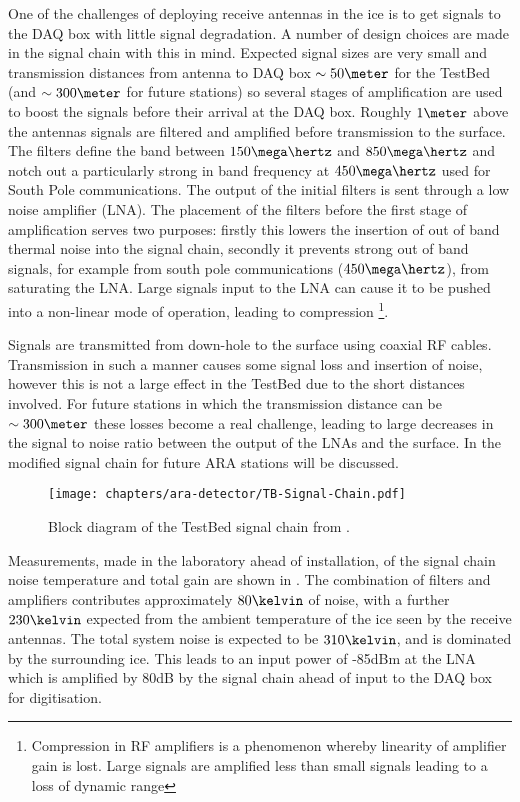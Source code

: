 One of the challenges of deploying receive antennas in the ice is to get signals to the DAQ box with little signal degradation. A number of design choices are made in the signal chain with this in mind. Expected signal sizes are very small and transmission distances from antenna to DAQ box $\sim 50\meter$ for the TestBed (and $\sim 300\meter$ for future stations) so several stages of amplification are used to boost the signals before their arrival at the DAQ box. Roughly $1 \meter$ above the antennas signals are filtered and amplified before transmission to the surface. The filters define the band between $150 \mega\hertz$ and $850 \mega\hertz$ and notch out a particularly strong in band frequency at $450 \mega \hertz$ used for South Pole communications. The output of the initial filters is sent through a low noise amplifier (LNA). The placement of the filters before the first stage of amplification serves two purposes: firstly this lowers the insertion of out of band thermal noise into the signal chain, secondly it prevents strong out of band signals, for example from south pole communications ($450 \mega\hertz$), from saturating the LNA. Large signals input to the LNA can cause it to be pushed into a non-linear mode of operation, leading to compression \footnote{Compression in RF amplifiers is a phenomenon whereby linearity of amplifier gain is lost. Large signals are amplified less than small signals leading to a loss of dynamic range}.

Signals are transmitted from down-hole to the surface using coaxial RF cables. Transmission in such a manner causes some signal loss and insertion of noise, however this is not a large effect in the TestBed due to the short distances involved. For future stations in which the transmission distance can be $\sim 300 \meter$ these losses become a real challenge, leading to large decreases in the signal to noise ratio between the output of the LNAs and the surface. In  the modified signal chain for future ARA stations will be discussed.

\begin{figure}[htpb]
  \centering
  \texttt{[image: chapters/ara-detector/TB-Signal-Chain.pdf]}
  \caption{Block diagram of the TestBed signal chain from \cite{Allison2012457}.}
  \label{fig:ara-detector:TestBed:Signal-Chain}
\end{figure}

Measurements, made in the laboratory ahead of installation, of the signal chain noise temperature and total gain are shown in . The combination of filters and amplifiers contributes approximately $80 \kelvin$ of noise, with a further $230 \kelvin$ expected from the ambient temperature of the ice seen by the receive antennas. The total system noise is expected to be $310 \kelvin$, and is dominated by the surrounding ice. This leads to an input power of -85dBm at the LNA which is amplified by 80dB by the signal chain ahead of input to the DAQ box for digitisation.

